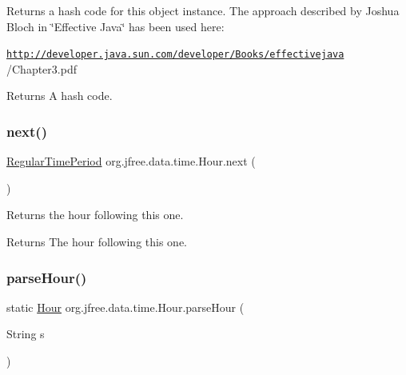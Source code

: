Returns a hash code for this object instance. The approach described by Joshua Bloch in \char`\"{}\+Effective Java\char`\"{} has been used here\+: 

{\ttfamily \href{http://developer.java.sun.com/developer/Books/effectivejava}{\tt http\+://developer.\+java.\+sun.\+com/developer/\+Books/effectivejava} /\+Chapter3.pdf}

\begin{DoxyReturn}{Returns}
A hash code. 
\end{DoxyReturn}
\mbox{\label{classorg_1_1jfree_1_1data_1_1time_1_1_hour_a6307ac2c099c7f333e96684e8e8a510a}} 
\subsubsection{\texorpdfstring{next()}{next()}}
{\footnotesize\ttfamily \mbox{\hyperlink{classorg_1_1jfree_1_1data_1_1time_1_1_regular_time_period}{Regular\+Time\+Period}} org.\+jfree.\+data.\+time.\+Hour.\+next (\begin{DoxyParamCaption}{ }\end{DoxyParamCaption})}

Returns the hour following this one.

\begin{DoxyReturn}{Returns}
The hour following this one. 
\end{DoxyReturn}
\mbox{\label{classorg_1_1jfree_1_1data_1_1time_1_1_hour_a07afe0ba33b727d0d7d30200c2792681}} 
\subsubsection{\texorpdfstring{parse\+Hour()}{parseHour()}}
{\footnotesize\ttfamily static \mbox{\hyperlink{classorg_1_1jfree_1_1data_1_1time_1_1_hour}{Hour}} org.\+jfree.\+data.\+time.\+Hour.\+parse\+Hour (\begin{DoxyParamCaption}\item[{String}]{s }\end{DoxyParamCaption})\hspace{0.3cm}{\ttfamily [static]}}

